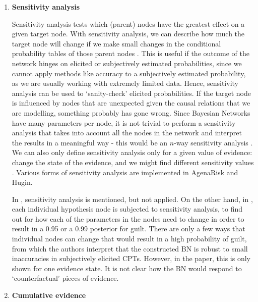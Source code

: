 \documentclass[12pt]{article}
\begin{document}
\begin{enumerate}

\item \textbf{Sensitivity analysis}

Sensitivity analysis tests which (parent) nodes have the greatest effect on a given target node. With sensitivity analysis, we can describe how much the target node will change if we make small changes in the conditional probability tables of those parent nodes \citep{fentonNeil2013}. This is useful if the outcome of the network hinges on elicited or subjectively estimated probabilities, since we cannot apply methods like accuracy to a subjectively estimated probability, as we are usually working with extremely limited data. Hence, sensitivity analysis can be used to `sanity-check' elicited probabilities. If the target node is influenced by nodes that are unexpected given the causal relations that we are modelling, something probably has gone wrong. Since Bayesian Networks have many parameters per node, it is not trivial to perform a sensitivity analysis that takes into account all the nodes in the network and interpret the results in a meaningful way - this would be an $n$-way sensitivity analysis \citep{gaag2007}. We can also only define sensitivity analysis only for a given value of evidence: change the state of the evidence, and we might find different sensitivity values \citep{fentonNeil2013}. Various forms of sensitivity analysis are implemented in AgenaRisk and Hugin.

In \citet{vlek2016}, sensitivity analysis is mentioned, but not applied. On the other hand, in \citet{Fenton2019}, each individual hypothesis node is subjected to sensitivity analysis, to find out for how each of the parameters in the nodes need to change in order to result in a 0.95 or a 0.99 posterior for guilt. There are only a few ways that individual nodes can change that would result in a high probability of guilt, from which the authors interpret that the constructed BN is robust to small inaccuracies in subjectively elicited CPTs. However, in the paper, this is only shown for one evidence state. It is not clear how the BN would respond to `counterfactual' pieces of evidence.


\item \textbf{Cumulative evidence}


\end{enumerate}
\end{document}
